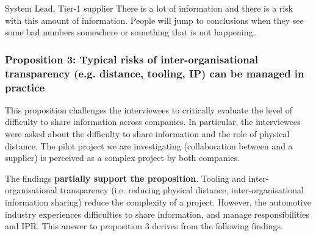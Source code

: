\begin{aquote}{System Lead, Tier-1 supplier}
There is a lot of information and there is a risk with this amount of information. People will jump to conclusions when they see some bad numbers somewhere or something that is not happening. %
\end{aquote}



%


\subsubsection{Proposition 3: Typical risks of inter-organisational transparency (e.g. distance, tooling, IP) can be managed in practice}

This proposition challenges the interviewees to critically evaluate the level of difficulty to share information across companies. In particular, the interviewees were asked about the difficulty to share information and the role of physical distance. The pilot project we are investigating (collaboration between \company{} and a supplier) is perceived as a complex project by both companies. %

The findings {\bf partially support the proposition}. Tooling and inter-organisational transparency (i.e. reducing physical distance,  inter-organisational information sharing) reduce the complexity of a project. However, the automotive industry experiences difficulties to share information, and manage responsibilities and IPR. This answer to proposition 3 %
derives from the following findings.

